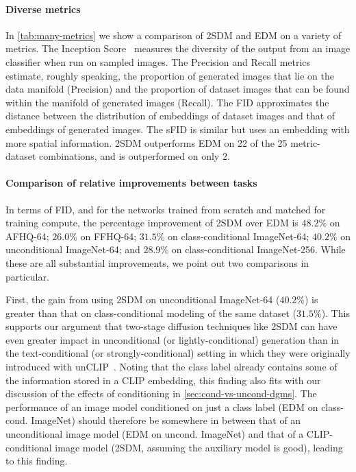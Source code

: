 \paragraph{Diverse metrics}
In \cref{tab:many-metrics} we show a comparison of 2SDM and EDM on a variety of metrics. The Inception Score~\citep{salimans2016improved,barratt2018note} measures the diversity of the output from an image classifier when run on sampled images. The Precision and Recall metrics~\citep{kynkaanniemi2019improved} estimate, roughly speaking, the proportion of generated images that lie on the data manifold (Precision) and the proportion of dataset images that can be found within the manifold of generated images (Recall). The FID approximates the distance between the distribution of embeddings of dataset images and that of embeddings of generated images. The sFID is similar but uses an embedding with more spatial information. 2SDM outperforms EDM on 22 of the 25 metric-dataset combinations, and is outperformed on only 2.

\paragraph{Comparison of relative improvements between tasks}
In terms of FID, and for the networks trained from scratch and matched for training compute, the percentage improvement of 2SDM over EDM is $48.2\%$ on AFHQ-64; $26.0\%$ on FFHQ-64; $31.5\%$ on class-conditional ImageNet-64; $40.2\%$ on unconditional ImageNet-64; and $28.9\%$ on class-conditional ImageNet-256. While these are all substantial improvements, we point out two comparisons in particular. 

First, the gain from using 2SDM on unconditional ImageNet-64 ($40.2\%$) is greater than that on class-conditional modeling of the same dataset ($31.5\%$). This supports our argument that two-stage diffusion techniques like 2SDM can have even greater impact in unconditional (or lightly-conditional) generation than in the text-conditional (or strongly-conditional) setting in which they were originally introduced with unCLIP~\citep{ramesh2022hierarchical}.  Noting that the class label already contains some of the information stored in a CLIP embedding, this finding also fits with our discussion of the effects of conditioning in \cref{sec:cond-vs-uncond-dgms}. The performance of an image model conditioned on just a class label (EDM on class-cond. ImageNet) should therefore be somewhere in between that of an unconditional image model (EDM on uncond. ImageNet) and that of a CLIP-conditional image model (2SDM, assuming the auxiliary model is good), leading to this finding.

